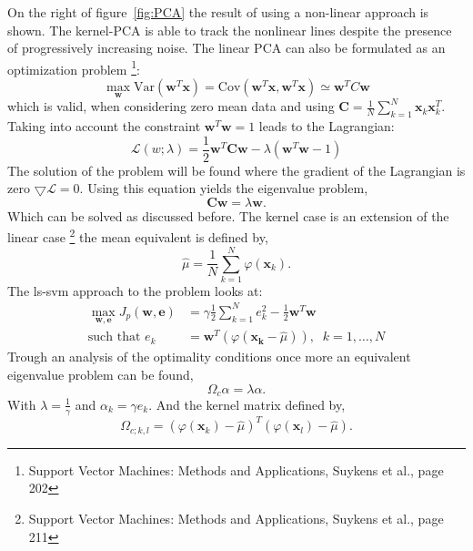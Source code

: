 On the right of figure~\ref{fig:PCA} the result of using a non-linear approach is shown. The kernel-PCA is able to track the nonlinear lines despite the presence of progressively increasing noise.
The linear PCA can also be formulated as an optimization problem \footnote{Support Vector Machines: Methods and Applications, Suykens et al., page 202}:
\begin{equation}
\max\limits_{\mathbf{w}} \text{Var}(\mathbf{w}^T\mathbf{x}) = \text{Cov}(\mathbf{w}^T\mathbf{x}, \mathbf{w}^T\mathbf{x}) \simeq \mathbf{w}^T C \mathbf{w}
\end{equation} 
which is valid, when considering zero mean data and using $\mathbf{C} = \frac{1}{N}\sum_{k=1}^{N} \mathbf{x}_k \mathbf{x}_k^T $. Taking into account the constraint $\mathbf{w}^T \mathbf{w} = 1$ leads to the Lagrangian:
\begin{equation}
\mathcal{L}(w; \lambda) = \frac{1}{2}\mathbf{w}^T\mathbf{C}\mathbf{w} - \lambda (\mathbf{w}^T \mathbf{w} - 1) 
\end{equation}
The solution of the problem will be found where the gradient of the Lagrangian is zero $\bigtriangledown \mathcal{L} = 0$. Using this equation yields the eigenvalue problem,
\begin{equation}
\mathbf{C}\mathbf{w} = \lambda \mathbf{w}.
\end{equation}
Which can be solved as discussed before. The kernel case is an extension of the linear case \footnote{Support Vector Machines: Methods and Applications, Suykens et al., page 211} the mean equivalent is defined by,
\begin{equation}
\hat{\mu} = \frac{1}{N} \sum\limits_{k=1}^{N} \varphi(\mathbf{x}_k).
\end{equation}
The ls-svm approach to the problem looks at:
\begin{align}
\max\limits_{\mathbf{w},\mathbf{e}} J_p(\mathbf{w},\mathbf{e}) &= \gamma \frac{1}{2}\sum\limits_{k=1}^{N} e_k^2 - \frac{1}{2}\mathbf{w}^T\mathbf{w} \\
\text{such that } e_k &= \mathbf{w}^T (\varphi(\mathbf{x_k} - \hat{\mu})), \;\; k = 1,\dots,N
\end{align}
Trough an analysis of the optimality conditions once more an equivalent eigenvalue problem can be found,
\begin{equation}
\Omega_c \alpha = \lambda \alpha.
\end{equation} 
With $\lambda = \frac{1}{\gamma}$ and $\alpha_k = \gamma e_k$. And the kernel matrix defined by,
\begin{equation}
\Omega_{c; k,l} = (\varphi(\mathbf{x}_k) - \hat{\mu})^T (\varphi(\mathbf{x}_l) - \hat{\mu}).
\end{equation}
